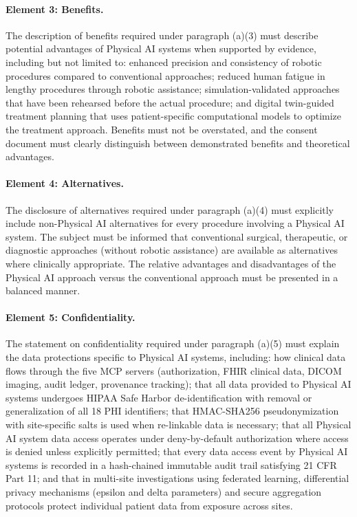 \documentclass[11pt]{article}
\begin{document}
\paragraph{Element 3: Benefits.} The description of benefits required under paragraph (a)(3) must describe potential advantages of Physical AI systems when supported by evidence, including but not limited to: enhanced precision and consistency of robotic procedures compared to conventional approaches; reduced human fatigue in lengthy procedures through robotic assistance; simulation-validated approaches that have been rehearsed before the actual procedure; and digital twin-guided treatment planning that uses patient-specific computational models to optimize the treatment approach. Benefits must not be overstated, and the consent document must clearly distinguish between demonstrated benefits and theoretical advantages.

\paragraph{Element 4: Alternatives.} The disclosure of alternatives required under paragraph (a)(4) must explicitly include non-Physical AI alternatives for every procedure involving a Physical AI system. The subject must be informed that conventional surgical, therapeutic, or diagnostic approaches (without robotic assistance) are available as alternatives where clinically appropriate. The relative advantages and disadvantages of the Physical AI approach versus the conventional approach must be presented in a balanced manner.

\paragraph{Element 5: Confidentiality.} The statement on confidentiality required under paragraph (a)(5) must explain the data protections specific to Physical AI systems, including: how clinical data flows through the five MCP servers (authorization, FHIR clinical data, DICOM imaging, audit ledger, provenance tracking); that all data provided to Physical AI systems undergoes HIPAA Safe Harbor de-identification with removal or generalization of all 18 PHI identifiers; that HMAC-SHA256 pseudonymization with site-specific salts is used when re-linkable data is necessary; that all Physical AI system data access operates under deny-by-default authorization where access is denied unless explicitly permitted; that every data access event by Physical AI systems is recorded in a hash-chained immutable audit trail satisfying 21 CFR Part 11; and that in multi-site investigations using federated learning, differential privacy mechanisms (epsilon and delta parameters) and secure aggregation protocols protect individual patient data from exposure across sites.
\end{document}
